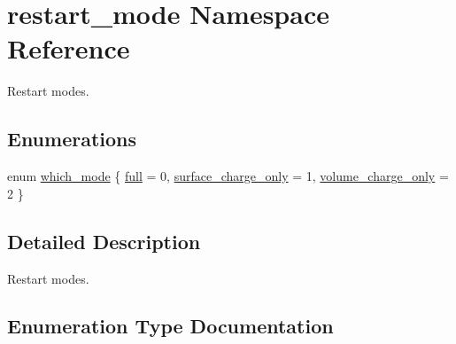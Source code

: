 \hypertarget{namespacerestart__mode}{}\section{restart\+\_\+mode Namespace Reference}
\label{namespacerestart__mode}


Restart modes.  


\subsection*{Enumerations}
\begin{DoxyCompactItemize}
\item 
enum \hyperlink{namespacerestart__mode_aa9c13b092e65386120f08a8862e576ee}{which\+\_\+mode} \{ \hyperlink{namespacerestart__mode_aa9c13b092e65386120f08a8862e576eeab9574a3e991f026dd44e29d1bf01bb18}{full} = 0, 
\hyperlink{namespacerestart__mode_aa9c13b092e65386120f08a8862e576eeabbca8cbf7efb1daef62378e1af5a829b}{surface\+\_\+charge\+\_\+only} = 1, 
\hyperlink{namespacerestart__mode_aa9c13b092e65386120f08a8862e576eea23cf5e0805fa4f6c921fb27706e91913}{volume\+\_\+charge\+\_\+only} = 2
 \}
\end{DoxyCompactItemize}


\subsection{Detailed Description}
Restart modes. 

\subsection{Enumeration Type Documentation}
